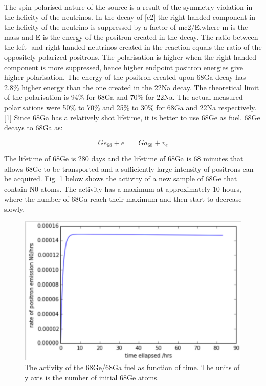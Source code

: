The spin polarised nature of the source is a result of the symmetry violation in the helicity of the neutrinos. In the decay of \ref{e2} the right-handed component in the helicity of the neutrino is suppressed by a factor of mc2/E,where m is the mass and E is the energy of the positron created in the decay. The ratio between the left- and right-handed neutrinos created in the reaction equals the ratio of the oppositely polarized positrons. The polarisation is higher when the right-handed component is more suppressed, hence higher endpoint positron energies give higher polarisation. The energy of the positron created upon 68Ga decay has 2.8\% higher energy than the one created in the 22Na decay. The theoretical limit of the polarisation is 94\% for 68Ga and 70\% for 22Na. The actual measured polarisations were 50\% to 70\% and 25\% to 30\% for 68Ga and  22Na respectively.[1]
Since 68Ga has a relatively shot lifetime, it is better to use 68Ge as fuel.  68Ge decays to 68Ga as:

\begin{equation}
\label{e3}
Ge_{68} + e^- = Ga_{68} + v_e
\end{equation}

The lifetime of 68Ge is 280 days and the lifetime of 68Ga is 68 minutes that allows 68Ge to be transported and a sufficiently large intensity of positrons can be acquired. Fig. 1 below shows the activity of a new sample of 68Ge that contain N0 atoms. The activity has a maximum at approximately 10 hours, where the number of 68Ga reach their maximum and then start to decrease slowly. 

\begin{figure}[h]
\centering
\includegraphics{Figures/C2F1}
\decoRule
\caption[C2F1]{The activity of the 68Ge/68Ga fuel as function of time. The units of y axis is the number of initial 68Ge atoms.}
\label{fig:C2F1}
\end{figure}

